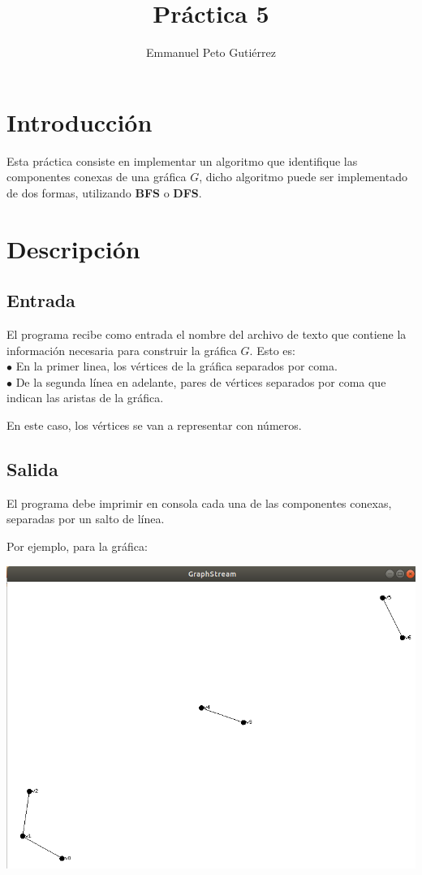 \documentclass{article}
\title{Práctica 5}
\author{Emmanuel Peto Gutiérrez}
\begin{document}
\maketitle

\section{Introducción}

Esta práctica consiste en implementar un algoritmo que identifique las componentes conexas de una gráfica $G$, dicho algoritmo puede ser implementado de dos formas, utilizando {\bf BFS} o {\bf DFS}.

\section{Descripción}

\subsection{Entrada}

El programa recibe como entrada el nombre del archivo de texto que contiene la información necesaria para construir la gráfica $G$. Esto es:\\
$\bullet$ En la primer linea, los vértices de la gráfica separados por coma.\\
$\bullet$ De la segunda línea en adelante, pares de vértices separados por coma que indican las aristas de la gráfica.

En este caso, los vértices se van a representar con números.

\subsection{Salida}

El programa debe imprimir en consola cada una de las componentes conexas, separadas por un salto de línea.

Por ejemplo, para la gráfica:

\includegraphics[scale=0.2]{3component}
\end{document}
